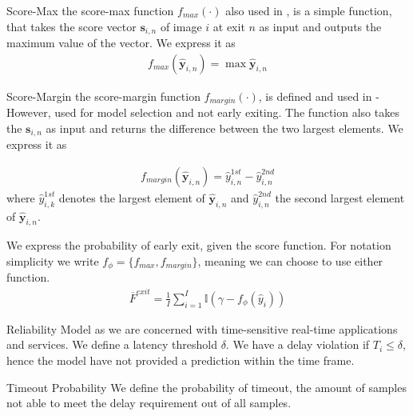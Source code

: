 \begin{enumdescript}
		\begin{enumdescript}
			
			
			\item[Score-Max] the score-max function $ f_{max}(\cdot)$ also used in \cite{leroux_resource-constrained_2015}, is a simple function, that takes the score vector $ \bm{s}_{i,n} $ of image $ i $ at exit $ n $ as input and outputs the maximum value of the vector. We express it as 
			\begin{align}
			f_{max}\left(\bm{\hat{y}}_{i,n}\right) = \max \bm{\hat{y}}_{i,n}
			\end{align}
			
			
			\item[Score-Margin] the score-margin function $ f_{margin}(\cdot)$, is defined and used in \cite{park_big/little_2015}- However, used for model selection and not early exiting. The function also takes the $ \bm{s}_{i,n} $ as input and returns the difference between the two largest elements. We express it as
			
			\begin{align}
			f_{margin}\left(\bm{\hat{y}}_{i,n}\right) = \hat{y}_{i,n}^{1st} - \hat{y}_{i,n}^{2nd}
			\end{align}
			where $ \hat{y}_{i,k}^{1st} $ denotes the largest element of $ \bm{\hat{y}}_{i,n} $ 
			and $ \hat{y}_{i,n}^{2nd} $ the second largest element of $ \bm{\hat{y}}_{i,n} $.
			
			
		\end{enumdescript}
		
		
		We express the probability of early exit, given the score function. For notation simplicity we write $ f_{\phi} = \{f_{max}, f_{margin}\}$, meaning we can choose to use either function. 
		\begin{align}
		\overline{F}^{exit} = \frac{1}{I}\sum_{i=1}^{I} \mathbb{I} \left(\gamma-f_{\phi}\left(\hat{y}_{i}\right) \right)
		\end{align}
	
	\item[Reliability Model] as we are concerned with time-sensitive real-time applications and services. We define a latency threshold $ \delta $. We have a delay violation if $ T_i \leq \delta $, hence the model have not provided a prediction within the time frame.
	
	\begin{enumdescript}
		\item[Timeout Probability]  We define the probability of timeout, the amount of samples not able to meet the delay requirement out of all samples.
		

\end{enumdescript}
\end{enumdescript}
